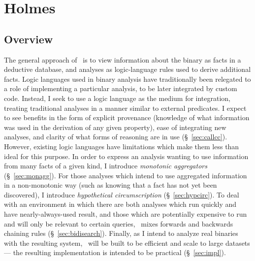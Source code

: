 \chapter{Holmes}
\section{Overview}
The general approach of \sysname\ is to view information about the binary as facts in a deductive database, and analyses as logic-language rules used to derive additional facts.
Logic languages used in binary analysis have traditionally been relegated to a role of implementing a particular analysis, to be later integrated by custom code\cite{bddbddb,Alpuente2011,Brumley2006b,Lam2005a,Smaragdakis}.
Instead, I seek to use a logic language as the medium for integration, treating traditional analyses in a manner similar to external predicates.
I expect to see benefits in the form of explicit provenance (knowledge of what information was used in the derivation of any given property), ease of integrating new analyses, and clarity of what forms of reasoning are in use (\S~\ref{sec:callcc}).
However, existing logic languages have limitations which make them less than ideal for this purpose.
In order to express an analysis wanting to use information from many facts of a given kind, I introduce \emph{monotonic aggregators} (\S~\ref{sec:monagg}).
For those analyses which intend to use aggregated information in a non-monotonic way (such as knowing that a fact has not yet been discovered), I introduce \emph{hypothetical circumscription} (\S~\ref{sec:hypcirc}).
To deal with an environment in which there are both analyses which run quickly and have nearly-always-used result, and those which are potentially expensive to run and will only be relevant to certain queries, \sysname\ mixes forwards and backwards chaining rules (\S~\ref{sec:bidisearch}).
Finally, as I intend to analyze real binaries with the resulting system, \sysname\ will be built to be efficient and scale to large datasets --- the resulting implementation is intended to be practical (\S~\ref{sec:impl}).

